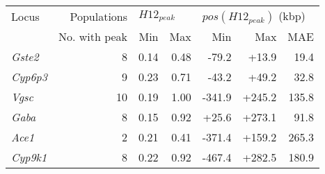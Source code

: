 \begin{tabular}{lrrrrrr}
\toprule
           Locus &   Populations & \multicolumn{2}{l}{$H12_{peak}$} & \multicolumn{3}{l}{$pos(H12_{peak})$ (kbp)} \\
                 & No. with peak &          Min &  Max &                     Min &    Max &   MAE \\
\midrule
  \textit{Gste2} &             8 &         0.14 & 0.48 &                   -79.2 &  +13.9 &  19.4 \\
 \textit{Cyp6p3} &             9 &         0.23 & 0.71 &                   -43.2 &  +49.2 &  32.8 \\
   \textit{Vgsc} &            10 &         0.19 & 1.00 &                  -341.9 & +245.2 & 135.8 \\
   \textit{Gaba} &             8 &         0.15 & 0.92 &                   +25.6 & +273.1 &  91.8 \\
   \textit{Ace1} &             2 &         0.21 & 0.41 &                  -371.4 & +159.2 & 265.3 \\
 \textit{Cyp9k1} &             8 &         0.22 & 0.92 &                  -467.4 & +282.5 & 180.9 \\
\bottomrule
\end{tabular}
